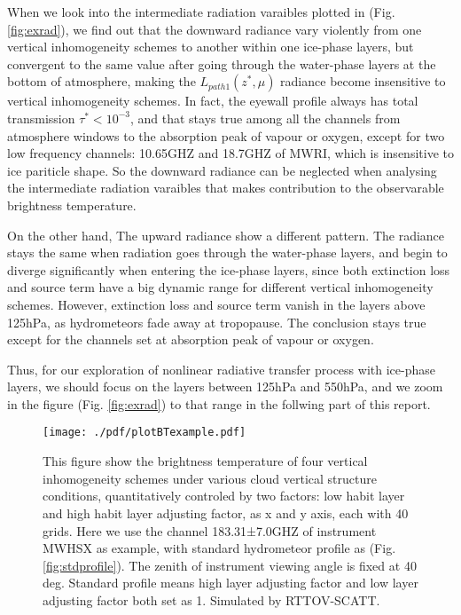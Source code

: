 When we look into the intermediate radiation varaibles plotted in (Fig. \ref{fig:exrad}), we find out that the 
downward radiance vary violently from one vertical inhomogeneity schemes to another within one ice-phase layers, but convergent to 
the same value after going through the water-phase layers at the bottom of atmosphere, making the $L_{path1}(z^{*}, \mu)$ radiance 
become insensitive to vertical inhomogeneity schemes. In fact, the eyewall profile always has total transmission $\tau^{*} < 10^{-3}$, 
and that stays true among all the channels from atmosphere windows to the absorption peak of vapour or oxygen, except for 
two low frequency channels: 10.65GHZ and 18.7GHZ of MWRI, which is insensitive to ice pariticle shape. 
So the downward radiance can be neglected when analysing the intermediate radiation varaibles that makes contribution 
to the observarable brightness temperature.

On the other hand, The upward radiance show a different pattern. The radiance stays the same when radiation goes through the water-phase
layers, and begin to diverge significantly when entering the ice-phase layers, since both extinction loss and source term have a big
dynamic range for different vertical inhomogeneity schemes. However, extinction loss and source term vanish in the layers above 125hPa, 
as hydrometeors fade away at tropopause. The conclusion stays true except for the channels set at absorption peak of vapour or oxygen.

Thus, for our exploration of nonlinear radiative transfer process with ice-phase layers, we should focus on the layers between
125hPa and 550hPa, and we zoom in the figure (Fig. \ref{fig:exrad}) to that range in the follwing part of this report.

\begin{figure}[hbtp] 
\centering
\texttt{[image: ./pdf/plotBTexample.pdf]}
\caption{This figure show the brightness temperature of four vertical inhomogeneity schemes under various cloud vertical 
structure conditions, quantitatively controled by two factors: low habit layer and high habit layer adjusting factor, 
as x and y axis, each with 40 grids. Here we use the channel 183.31±7.0GHZ of instrument MWHSX as example, with standard hydrometeor 
profile as (Fig. \ref{fig:stdprofile}). The zenith of instrument viewing angle is fixed at 40 deg.
Standard profile means high layer adjusting factor and low layer adjusting factor both set as 1.
Simulated by RTTOV-SCATT.}
\label{fig:exBT}
\end{figure}

